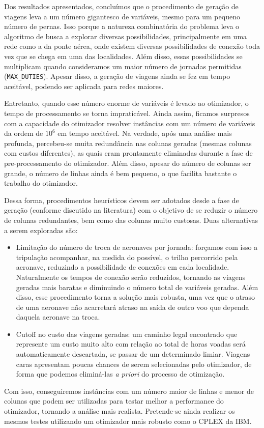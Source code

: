 \documentclass[12pt,a4paper]{article}
\begin{document}
Dos resultados apresentados, concluímos que o procedimento de geração de viagens leva a um número 
gigantesco de variáveis, mesmo para um pequeno número de pernas. Isso porque a natureza combinatória 
do problema leva o algoritmo de busca a explorar diversas possibilidades, principalmente em uma rede 
como a da ponte aérea, onde existem diversas possibilidades de conexão toda vez que se chega em uma
das localidades. Além disso, essas possibilidades se multiplicam quando consideramos um maior número
de jornadas permitidas (\verb|MAX_DUTIES|). Apesar disso, a geração de viagens ainda se fez em tempo 
aceitável, podendo ser aplicada para redes maiores. 

Entretanto, quando esse número enorme de variáveis é levado ao otimizador, o tempo de processamento 
se torna impraticável. Ainda assim, ficamos surpresos com a capacidade do otimizador resolver 
instâncias com um número de variáveis da ordem de $10^6$ em tempo aceitável. Na verdade, após uma
análise mais profunda, percebeu-se muita redundância nas colunas geradas (mesmas colunas com custos 
diferentes), as quais eram prontamente eliminadas durante a fase de pre-processamento do otimizador.
Além disso, apesar do número de colunas ser grande, o número de linhas ainda é bem pequeno, o que
facilita bastante o trabalho do otimizador.

Dessa forma, procedimentos heurísticos devem ser adotados desde a fase de geração (conforme 
discutido na literatura) com o objetivo de se reduzir o número de colunas redundantes, bem como das
colunas muito custosas. Duas alternativas a serem exploradas são:

\begin{itemize}
	\item Limitação do número de troca de aeronaves por jornada: forçamos com isso a tripulação
	acompanhar, na medida do possível, o trilho percorrido pela aeronave, reduzindo a possibilidade de
	conexões em cada localidade. Naturalmente os tempos de conexão serão reduzidos, tornando as 
	viagens geradas mais baratas e diminuindo o número total de variáveis geradas. Além disso, esse 
	procedimento torna a solução mais robusta, uma vez que o atraso de uma aeronave não acarretará 
	atraso na saída de outro voo que dependa daquela aeronave na troca. 
	\item Cutoff no custo das viagens geradas: um caminho legal encontrado que represente um custo 
	muito alto com relação ao total de horas voadas será automaticamente descartada, se passar de um 
	determinado limiar. Viagens caras apresentam poucas chances de serem selecionadas pelo otimizador, 
	de forma que podemos eliminá-las {\it a priori} do processo de otimização.
\end{itemize}

Com isso, conseguiremos instâncias com um número maior de linhas e menor de colunas que podem ser
utilizadas para testar melhor a performance do otimizador, tornando a análise mais realista.
Pretende-se ainda realizar os mesmos testes utilizando um otimizador mais robusto como o CPLEX da 
IBM.

\end{document}
